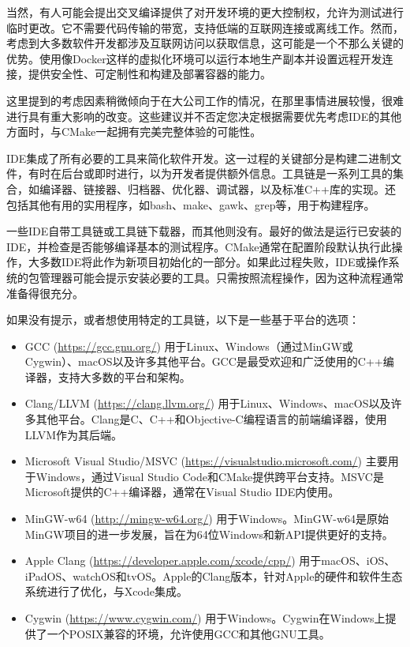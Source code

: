 当然，有人可能会提出交叉编译提供了对开发环境的更大控制权，允许为测试进行临时更改。它不需要代码传输的带宽，支持低端的互联网连接或离线工作。然而，考虑到大多数软件开发都涉及互联网访问以获取信息，这可能是一个不那么关键的优势。使用像Docker这样的虚拟化环境可以运行本地生产副本并设置远程开发连接，提供安全性、可定制性和构建及部署容器的能力。

这里提到的考虑因素稍微倾向于在大公司工作的情况，在那里事情进展较慢，很难进行具有重大影响的改变。这些建议并不否定您决定根据需要优先考虑IDE的其他方面时，与CMake一起拥有完美完整体验的可能性。


IDE集成了所有必要的工具来简化软件开发。这一过程的关键部分是构建二进制文件，有时在后台或即时进行，以为开发者提供额外信息。工具链是一系列工具的集合，如编译器、链接器、归档器、优化器、调试器，以及标准C++库的实现。还包括其他有用的实用程序，如bash、make、gawk、grep等，用于构建程序。

一些IDE自带工具链或工具链下载器，而其他则没有。最好的做法是运行已安装的IDE，并检查是否能够编译基本的测试程序。CMake通常在配置阶段默认执行此操作，大多数IDE将此作为新项目初始化的一部分。如果此过程失败，IDE或操作系统的包管理器可能会提示安装必要的工具。只需按照流程操作，因为这种流程通常准备得很充分。

如果没有提示，或者想使用特定的工具链，以下是一些基于平台的选项：

\begin{itemize}
\item
GCC (\url{https://gcc.gnu.org/}) 用于Linux、Windows（通过MinGW或Cygwin）、macOS以及许多其他平台。GCC是最受欢迎和广泛使用的C++编译器，支持大多数的平台和架构。

\item
Clang/LLVM (\url{https://clang.llvm.org/}) 用于Linux、Windows、macOS以及许多其他平台。Clang是C、C++和Objective-C编程语言的前端编译器，使用LLVM作为其后端。

\item
Microsoft Visual Studio/MSVC (\url{https://visualstudio.microsoft.com/}) 主要用于Windows，通过Visual Studio Code和CMake提供跨平台支持。MSVC是Microsoft提供的C++编译器，通常在Visual Studio IDE内使用。

\item
MinGW-w64 (\url{http://mingw-w64.org/}) 用于Windows。MinGW-w64是原始MinGW项目的进一步发展，旨在为64位Windows和新API提供更好的支持。

\item
Apple Clang (\url{https://developer.apple.com/xcode/cpp/}) 用于macOS、iOS、iPadOS、watchOS和tvOS。Apple的Clang版本，针对Apple的硬件和软件生态系统进行了优化，与Xcode集成。

\item
Cygwin (\url{https://www.cygwin.com/}) 用于Windows。Cygwin在Windows上提供了一个POSIX兼容的环境，允许使用GCC和其他GNU工具。
\end{itemize}

